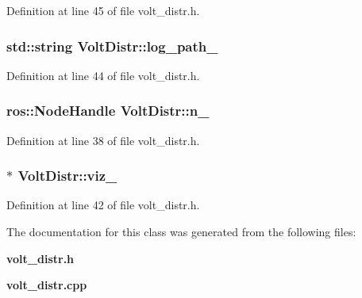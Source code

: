 \-Definition at line 45 of file volt\-\_\-distr.\-h.

\subsubsection[{log\-\_\-path\-\_\-}]{\setlength{\rightskip}{0pt plus 5cm}std\-::string {\bf \-Volt\-Distr\-::log\-\_\-path\-\_\-}\hspace{0.3cm}{\ttfamily  [private]}}\label{classVoltDistr_ab296165293edefb511067c182994d1a3}


\-Definition at line 44 of file volt\-\_\-distr.\-h.

\subsubsection[{n\-\_\-}]{\setlength{\rightskip}{0pt plus 5cm}ros\-::\-Node\-Handle {\bf \-Volt\-Distr\-::n\-\_\-}\hspace{0.3cm}{\ttfamily  [private]}}\label{classVoltDistr_a483f20db6b29c236a322f7cb848917ff}


\-Definition at line 38 of file volt\-\_\-distr.\-h.

\subsubsection[{viz\-\_\-}]{$\ast$ {\bf \-Volt\-Distr\-::viz\-\_\-}\hspace{0.3cm}{\ttfamily  [private]}}\label{classVoltDistr_a32c2d3297b1c1a8dac4888dba7f2dd9d}


\-Definition at line 42 of file volt\-\_\-distr.\-h.



\-The documentation for this class was generated from the following files\-:\begin{DoxyCompactItemize}
\item 
{\bf volt\-\_\-distr.\-h}\item 
{\bf volt\-\_\-distr.\-cpp}\end{DoxyCompactItemize}
